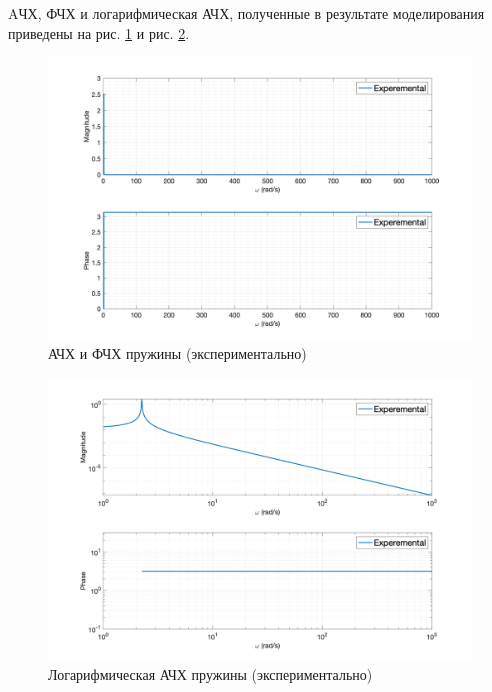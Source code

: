AЧХ, ФЧХ и логарифмическая АЧХ, полученные в результате моделирования приведены на рис. \ref{fig:task4_freq_resp_exp_lin} и рис. \ref{fig:task4_freq_resp_exp_loglog}.
\begin{figure}[ht!]
    \centering
    \includegraphics[width=\textwidth]{media/plots/task4_freq_resp_exp_lin.png}
    \caption{АЧХ и ФЧХ пружины (экспериментально)}
    \label{fig:task4_freq_resp_exp_lin}
\end{figure}
\begin{figure}[ht!]
    \centering
    \includegraphics[width=\textwidth]{media/plots/task4_freq_resp_exp_loglog.png}
    \caption{Логарифмическая АЧХ пружины (экспериментально)}
    \label{fig:task4_freq_resp_exp_loglog}
\end{figure}

